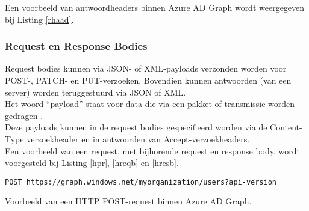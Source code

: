 Een voorbeeld van antwoordheaders binnen Azure \ac{AD} Graph wordt weergegeven bij Listing \ref{rhaad}. \\


\subsubsection{Request en Response Bodies}

Request bodies kunnen via \Ac{JSON}- of \ac{XML}-payloads verzonden worden voor POST-, PATCH- en PUT-verzoeken. Bovendien kunnen antwoorden (van een server) worden teruggestuurd via \ac{JSON} of \ac{XML}. \\

Het woord “payload” staat voor data die via een pakket of transmissie worden gedragen \autocite{Comer2006}. \\

Deze payloads kunnen in de request bodies gespecifieerd worden via de Content-Type verzoekheader en in antwoorden van Accept-verzoekheaders. \\

Een voorbeeld van een request, met bijhorende request en response body, wordt voorgesteld bij Listing \ref{hpr}, \ref{hreqb} en \ref{hresb}. \\

\begin{listing}[h]
\begin{verbatim}
POST https://graph.windows.net/myorganization/users?api-version
\end{verbatim}
\caption[Voorbeeld HTTP POST-request]{Voorbeeld van een \ac{HTTP} POST-request binnen Azure \ac{AD} Graph.}
\label{hpr}
\end{listing}

